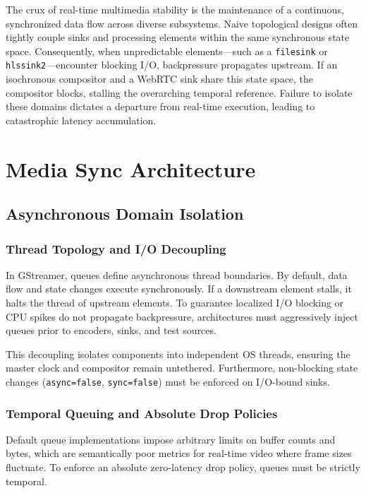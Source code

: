 \documentclass{article}
\begin{document}
The crux of real-time multimedia stability is the maintenance of a continuous, synchronized data flow
across diverse subsystems. Naive topological designs often tightly couple sinks and processing elements
within the same synchronous state space. Consequently, when unpredictable elements—such as a \texttt{filesink}
or \texttt{hlssink2}—encounter blocking I/O, backpressure propagates upstream. If an isochronous compositor
and a WebRTC sink share this state space, the compositor blocks, stalling the overarching temporal
reference. Failure to isolate these domains dictates a departure from real-time execution, leading to
catastrophic latency accumulation.

\section{Media Sync Architecture}

\subsection{Asynchronous Domain Isolation}

\subsubsection{Thread Topology and I/O Decoupling}

In GStreamer, queues define asynchronous thread boundaries. By default, data flow and state changes
execute synchronously. If a downstream element stalls, it halts the thread of upstream elements.
To guarantee localized I/O blocking or CPU spikes do not propagate backpressure, architectures
must aggressively inject queues prior to encoders, sinks, and test sources.

This decoupling isolates components into independent OS threads, ensuring the master clock and
compositor remain untethered. Furthermore, non-blocking state changes (\texttt{async=false}, \texttt{sync=false})
must be enforced on I/O-bound sinks.

\subsubsection{Temporal Queuing and Absolute Drop Policies}

Default queue implementations impose arbitrary limits on buffer counts and bytes, which are semantically
poor metrics for real-time video where frame sizes fluctuate. To enforce an absolute zero-latency
drop policy, queues must be strictly temporal.
\end{document}
